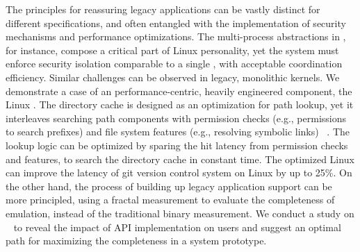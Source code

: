 The principles for reassuring legacy applications can be vastly distinct
for different specifications,
and often entangled with
the implementation of
security mechanisms and performance optimizations.
The multi-process abstractions in \graphene{}, for instance,
compose a critical part of Linux personality,
yet the system must enforce security isolation comparable to a single \picoproc{},
with acceptable coordination efficiency.
Similar challenges can be observed in legacy, monolithic kernels.
We demonstrate a case of an performance-centric, heavily engineered component,
the Linux .
The directory cache is designed as an optimization for path lookup,
yet it interleaves searching path components
with permission checks (e.g., permissions to search prefixes)
and file system features (e.g., resolving symbolic links)
~\citep{tsai15dcache}.
The lookup logic can be optimized
by sparing the hit latency from permission checks and features,
to search the directory cache in constant time.
The optimized Linux
can improve the latency of git version control system on Linux by up to 25\%.
On the other hand,
the process of building up legacy application support
can be more principled,
using a fractal measurement to evaluate the completeness of emulation,
instead of the traditional binary measurement.
%
We conduct a study on 
~\citep{tsai16apistudy}
to reveal the impact of API implementation on users
and suggest an optimal path for maximizing the completeness in a system prototype.


